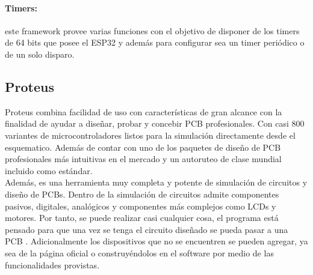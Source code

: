 \paragraph{Timers:}este framework provee varias funciones con el objetivo de disponer de los timers de 64 bits que posee el ESP32 y además para configurar sea un timer periódico o de un solo disparo.

\subsection{Proteus}

Proteus combina facilidad de uso con características de gran alcance con la finalidad de ayudar a diseñar, probar y concebir PCB profesionales. Con casi 800 variantes de microcontroladores listos para la simulación directamente desde el esquematico. Además de contar con uno de los paquetes de diseño de PCB profesionales más intuitivas en el mercado y un autoruteo de clase mundial incluido como estándar. \cite{Prot1} \\

Además, es una herramienta muy completa y potente de simulación de circuitos y diseño de PCBs. Dentro de la simulación de circuitos admite componentes pasivos, digitales, analógicos y componentes más complejos como LCDs y motores. Por tanto, se puede realizar casi cualquier cosa, el programa está pensado para que una vez se tenga el circuito diseñado se pueda pasar a una PCB \cite{Prot2}. Adicionalmente los dispositivos que no se encuentren se pueden agregar, ya sea de la página oficial o construyéndolos en el software por medio de las funcionalidades provistas.
